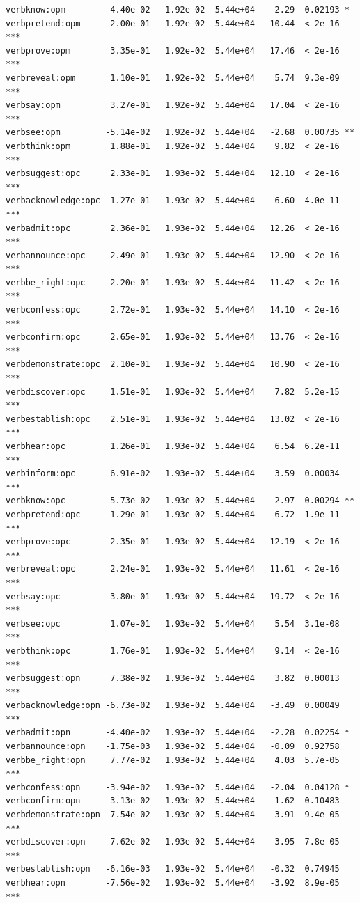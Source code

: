 \documentclass[10pt]{article}\usepackage[]{graphicx}\usepackage[]{color}
\makeatletter
\newenvironment{kframe}{%
 \def\at@end@of@kframe{}%
 \ifinner\ifhmode%
  \def\at@end@of@kframe{\end{minipage}}%
  \begin{minipage}{\columnwidth}%
 \fi\fi%
 \def\FrameCommand##1{\hskip\@totalleftmargin \hskip-\fboxsep
 \colorbox{shadecolor}{##1}\hskip-\fboxsep
     \hskip-\linewidth \hskip-\@totalleftmargin \hskip\columnwidth}%
 \MakeFramed {\advance\hsize-\width
   \@totalleftmargin\z@ \linewidth\hsize
   \@setminipage}}%
 {\par\unskip\endMakeFramed%
 \at@end@of@kframe}
\newenvironment{knitrout}{}{} %
\makeatother
\begin{document}
\begin{knitrout}
\begin{kframe}
\begin{verbatim}
verbknow:opm        -4.40e-02   1.92e-02  5.44e+04   -2.29  0.02193 *  
verbpretend:opm      2.00e-01   1.92e-02  5.44e+04   10.44  < 2e-16 ***
verbprove:opm        3.35e-01   1.92e-02  5.44e+04   17.46  < 2e-16 ***
verbreveal:opm       1.10e-01   1.92e-02  5.44e+04    5.74  9.3e-09 ***
verbsay:opm          3.27e-01   1.92e-02  5.44e+04   17.04  < 2e-16 ***
verbsee:opm         -5.14e-02   1.92e-02  5.44e+04   -2.68  0.00735 ** 
verbthink:opm        1.88e-01   1.92e-02  5.44e+04    9.82  < 2e-16 ***
verbsuggest:opc      2.33e-01   1.93e-02  5.44e+04   12.10  < 2e-16 ***
verbacknowledge:opc  1.27e-01   1.93e-02  5.44e+04    6.60  4.0e-11 ***
verbadmit:opc        2.36e-01   1.93e-02  5.44e+04   12.26  < 2e-16 ***
verbannounce:opc     2.49e-01   1.93e-02  5.44e+04   12.90  < 2e-16 ***
verbbe_right:opc     2.20e-01   1.93e-02  5.44e+04   11.42  < 2e-16 ***
verbconfess:opc      2.72e-01   1.93e-02  5.44e+04   14.10  < 2e-16 ***
verbconfirm:opc      2.65e-01   1.93e-02  5.44e+04   13.76  < 2e-16 ***
verbdemonstrate:opc  2.10e-01   1.93e-02  5.44e+04   10.90  < 2e-16 ***
verbdiscover:opc     1.51e-01   1.93e-02  5.44e+04    7.82  5.2e-15 ***
verbestablish:opc    2.51e-01   1.93e-02  5.44e+04   13.02  < 2e-16 ***
verbhear:opc         1.26e-01   1.93e-02  5.44e+04    6.54  6.2e-11 ***
verbinform:opc       6.91e-02   1.93e-02  5.44e+04    3.59  0.00034 ***
verbknow:opc         5.73e-02   1.93e-02  5.44e+04    2.97  0.00294 ** 
verbpretend:opc      1.29e-01   1.93e-02  5.44e+04    6.72  1.9e-11 ***
verbprove:opc        2.35e-01   1.93e-02  5.44e+04   12.19  < 2e-16 ***
verbreveal:opc       2.24e-01   1.93e-02  5.44e+04   11.61  < 2e-16 ***
verbsay:opc          3.80e-01   1.93e-02  5.44e+04   19.72  < 2e-16 ***
verbsee:opc          1.07e-01   1.93e-02  5.44e+04    5.54  3.1e-08 ***
verbthink:opc        1.76e-01   1.93e-02  5.44e+04    9.14  < 2e-16 ***
verbsuggest:opn      7.38e-02   1.93e-02  5.44e+04    3.82  0.00013 ***
verbacknowledge:opn -6.73e-02   1.93e-02  5.44e+04   -3.49  0.00049 ***
verbadmit:opn       -4.40e-02   1.93e-02  5.44e+04   -2.28  0.02254 *  
verbannounce:opn    -1.75e-03   1.93e-02  5.44e+04   -0.09  0.92758    
verbbe_right:opn     7.77e-02   1.93e-02  5.44e+04    4.03  5.7e-05 ***
verbconfess:opn     -3.94e-02   1.93e-02  5.44e+04   -2.04  0.04128 *  
verbconfirm:opn     -3.13e-02   1.93e-02  5.44e+04   -1.62  0.10483    
verbdemonstrate:opn -7.54e-02   1.93e-02  5.44e+04   -3.91  9.4e-05 ***
verbdiscover:opn    -7.62e-02   1.93e-02  5.44e+04   -3.95  7.8e-05 ***
verbestablish:opn   -6.16e-03   1.93e-02  5.44e+04   -0.32  0.74945    
verbhear:opn        -7.56e-02   1.93e-02  5.44e+04   -3.92  8.9e-05 ***

\end{verbatim}
\end{kframe}
\end{knitrout}
\end{document}
